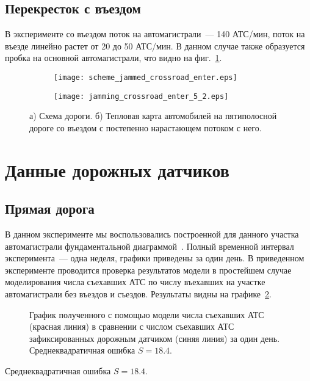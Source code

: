\subsection{Перекресток с въездом}
В эксперименте со въездом поток на автомагистрали~--- 140 АТС/мин, поток на въезде линейно растет от 20 до 50 АТС/мин. В данном случае также образуется пробка на основной автомагистрали, что видно на фиг.~\ref{fig:jamming_crossroad_enter_5_1}.
\begin{figure}[ht]
    \begin{subfigure}[b]{1.0\textwidth}
       \texttt{[image: scheme\_jammed\_crossroad\_enter.eps]}
       \caption{}
    \end{subfigure}

    \begin{subfigure}[b]{1.0\textwidth}
       \texttt{[image: jamming\_crossroad\_enter\_5\_2.eps]}
       \caption{}
    \end{subfigure}

    \caption{а) Схема дороги. б) Тепловая карта автомобилей на пятиполосной дороге со въездом с постепенно нарастающем потоком с него.}
    \label{fig:jamming_crossroad_enter_5_1}
\end{figure}

\section{Данные дорожных датчиков}
\subsection{Прямая дорога}
\label{sec::experiment_1}
В данном эксперименте мы воспользовались построенной для данного участка автомагистрали фундаментальной диаграммой~\cite{collectiveArticle2}.
Полный временной интервал эксперимента~--- одна неделя, графики приведены за один день.
В приведенном эксперименте проводится проверка результатов модели в простейшем случае моделирования числа съехавших АТС по числу въехавших на участке автомагистрали без въездов и съездов.
Результаты видны на графике~\ref{fig:MCAR_simple_test}.
\begin{figure}[ht]
    \caption{График полученного с помощью модели числа съехавших АТС (красная линия) в сравнении с числом съехавших АТС зафиксированных дорожным датчиком (синяя линия) за один день. Среднеквадратичная ошибка $S = 18.4$.}
    \label{fig:MCAR_simple_test}
\end{figure}
Среднеквадратичная ошибка $S = 18.4$.

